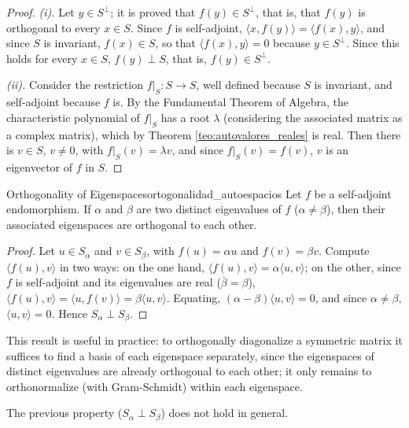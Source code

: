 \documentclass[11pt, a4paper]{article}
\begin{document}
\begin{proof}
\textit{(i).} Let $y \in S^\perp$; it is proved that $f(y) \in S^\perp$, that is, that $f(y)$ is orthogonal to every $x \in S$. Since $f$ is self-adjoint, $\langle x, f(y) \rangle = \langle f(x), y \rangle$, and since $S$ is invariant, $f(x) \in S$, so that $\langle f(x), y \rangle = 0$ because $y \in S^\perp$. Since this holds for every $x \in S$, $f(y) \perp S$, that is, $f(y) \in S^\perp$.

\textit{(ii).} Consider the restriction $f|_S: S \to S$, well defined because $S$ is invariant, and self-adjoint because $f$ is. By the Fundamental Theorem of Algebra, the characteristic polynomial of $f|_S$ has a root $\lambda$ (considering the associated matrix as a complex matrix), which by Theorem \ref{teo:autovalores_reales} is real. Then there is $v \in S$, $v \neq 0$, with $f|_S(v) = \lambda v$, and since $f|_S(v) = f(v)$, $v$ is an eigenvector of $f$ in $S$.
\end{proof}

\begin{proposicion}{Orthogonality of Eigenspaces}{ortogonalidad_autoespacios}
Let $f$ be a self-adjoint endomorphism. If $\alpha$ and $\beta$ are two distinct eigenvalues of $f$ ($\alpha \neq \beta$), then their associated eigenspaces are orthogonal to each other.
\end{proposicion}

\begin{proof}
Let $u \in S_\alpha$ and $v \in S_\beta$, with $f(u) = \alpha u$ and $f(v) = \beta v$. Compute $\langle f(u), v \rangle$ in two ways: on the one hand, $\langle f(u), v \rangle = \alpha \langle u, v \rangle$; on the other, since $f$ is self-adjoint and its eigenvalues are real ($\overline{\beta} = \beta$), $\langle f(u), v \rangle = \langle u, f(v) \rangle = \beta \langle u, v \rangle$. Equating, $(\alpha - \beta) \langle u, v \rangle = 0$, and since $\alpha \neq \beta$, $\langle u, v \rangle = 0$. Hence $S_\alpha \perp S_\beta$.
\end{proof}

\obs This result is useful in practice: to orthogonally diagonalize a symmetric matrix it suffices to find a basis of each eigenspace separately, since the eigenspaces of distinct eigenvalues are already orthogonal to each other; it only remains to orthonormalize (with Gram-Schmidt) within each eigenspace.

\obs The previous property ($S_\alpha \perp S_\beta$) does not hold in general.
    
\end{document}
